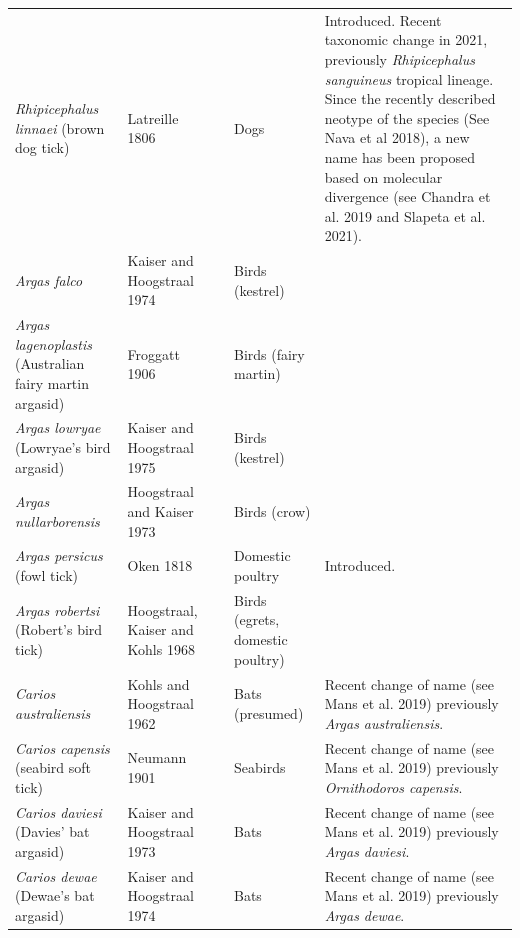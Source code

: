 \documentclass[a4paper, nobind]{templates/ociamthesis}
\begin{document}
\begin{landscape}
\begin{longtable}[t]{>{\raggedright\arraybackslash}p{4cm}>{\raggedright\arraybackslash}p{3cm}>{\raggedright\arraybackslash}p{1cm}>{\raggedright\arraybackslash}p{4cm}>{\raggedright\arraybackslash}p{6cm}}
\textit{Rhipicephalus linnaei} (brown dog tick) & Latreille 1806 & \multicolumn{1}{c}{\cellcolor[HTML]{8DD3C7}{\textcolor{white}{Y}}} & Dogs & Introduced. Recent taxonomic change in 2021, previously \textit{Rhipicephalus sanguineus} tropical lineage. Since the recently described neotype of the species (See Nava et al 2018), a new name has been proposed based on molecular divergence (see Chandra et al. 2019 and Slapeta et al. 2021).\\
\textit{Argas falco} & Kaiser and Hoogstraal 1974 & \multicolumn{1}{c}{\cellcolor[HTML]{BEBADA}{\textcolor{white}{N}}} & Birds (kestrel) & \\
\textit{Argas lagenoplastis} (Australian fairy martin argasid) & Froggatt 1906 & \multicolumn{1}{c}{\cellcolor[HTML]{BEBADA}{\textcolor{white}{N}}} & Birds (fairy martin) & \\
\textit{Argas lowryae} (Lowryae's bird argasid) & Kaiser and Hoogstraal 1975 & \multicolumn{1}{c}{\cellcolor[HTML]{BEBADA}{\textcolor{white}{N}}} & Birds (kestrel) & \\
\textit{Argas nullarborensis} & Hoogstraal and Kaiser 1973 & \multicolumn{1}{c}{\cellcolor[HTML]{BEBADA}{\textcolor{white}{N}}} & Birds (crow) & \\
\textit{Argas persicus} (fowl tick) & Oken 1818 & \multicolumn{1}{c}{\cellcolor[HTML]{8DD3C7}{\textcolor{white}{Y}}} & Domestic poultry & Introduced.\\
\textit{Argas robertsi} (Robert's bird tick) & Hoogstraal, Kaiser and Kohls 1968 & \multicolumn{1}{c}{\cellcolor[HTML]{BEBADA}{\textcolor{white}{N}}} & Birds (egrets, domestic poultry) & \\
\textit{Carios australiensis} & Kohls and Hoogstraal 1962 & \multicolumn{1}{c}{\cellcolor[HTML]{BEBADA}{\textcolor{white}{N}}} & Bats (presumed) & Recent change of name (see Mans et al. 2019) previously \textit{Argas australiensis}.\\
\textit{Carios capensis} (seabird soft tick) & Neumann 1901 & \multicolumn{1}{c}{\cellcolor[HTML]{8DD3C7}{\textcolor{white}{Y}}} & Seabirds & Recent change of name (see Mans et al. 2019) previously \textit{Ornithodoros capensis}.\\
\textit{Carios daviesi} (Davies' bat argasid) & Kaiser and Hoogstraal 1973 & \multicolumn{1}{c}{\cellcolor[HTML]{BEBADA}{\textcolor{white}{N}}} & Bats & Recent change of name (see Mans et al. 2019) previously \textit{Argas daviesi}.\\
\textit{Carios dewae} (Dewae's bat argasid) & Kaiser and Hoogstraal 1974 & \multicolumn{1}{c}{\cellcolor[HTML]{BEBADA}{\textcolor{white}{N}}} & Bats & Recent change of name (see Mans et al. 2019) previously \textit{Argas dewae}.\\

\end{longtable}
\end{landscape}
\end{document}
